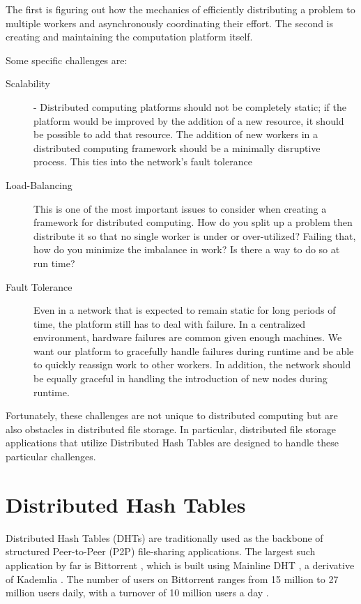 \documentclass[10pt,letterpaper,twoside]{report}
\begin{document}
The first is figuring out how the mechanics of efficiently distributing a problem to multiple workers and asynchronously coordinating their effort.  
The second is creating and maintaining the computation platform itself.


Some specific challenges are:
\begin{description}
	\item[Scalability] - Distributed computing platforms should not be completely static; if the platform would be improved by the addition of a new resource, it should be possible to add that resource.  
	The addition of new workers in a distributed computing framework should be a minimally disruptive process.
    This ties into the network's fault tolerance
	\item[Load-Balancing]  This is one of the most important issues to consider when creating a framework for distributed computing. 
    How do you split up a problem then distribute it so that no single worker is under or over-utilized?
    Failing that, how do you minimize the imbalance in work?
    Is there a way to do so at run time?
    \item[Fault Tolerance]  Even in a network that is expected to remain static for long periods of time, the platform still has to deal with failure.  
    In a centralized environment, hardware failures are common given enough machines.
    We want our platform to gracefully handle failures during runtime and be able to quickly reassign work to other workers.
    In addition, the network should be equally graceful in handling the introduction of new nodes during runtime.
\end{description}

Fortunately, these challenges are not unique to distributed computing but are also obstacles in distributed file storage.  
In particular, distributed file storage applications that utilize Distributed Hash Tables are designed to handle these particular challenges.
\section{Distributed Hash Tables}
Distributed Hash Tables (DHTs) are traditionally used as the backbone of structured Peer-to-Peer (P2P) file-sharing applications.
The largest such application by far is Bittorrent \cite{bittorrent}, which is built using Mainline DHT \cite{mainline},  a  derivative of Kademlia \cite{kademlia}.
The number of users on Bittorrent ranges from 15 million to 27 million users daily, with a turnover of 10 million users a day \cite{mainline}.
\end{document}

